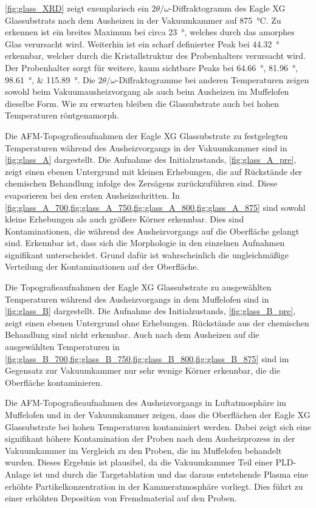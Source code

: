 \cref{fig:glass_XRD} zeigt exemplarisch ein $2\theta/\omega$-Diffraktogramm des Eagle XG Glassubstrats nach
dem Ausheizen in der Vakuumkammer auf \qty{875}{\degreeCelsius}.
Zu erkennen ist ein breites Maximum bei circa \qty{23}{\degree}, welches durch das amorphes Glas verursacht wird.
Weiterhin ist ein scharf definierter Peak bei \qty{44.32}{\degree} erkennbar, welcher durch die Kristallstruktur
des Probenhalters verursacht wird.
Der Probenhalter sorgt für weitere, kaum sichtbare Peaks bei \qtylist{64.66; 81.96; 98.61; 115.89}{\degree}.
Die $2\theta/\omega$-Diffraktogramme bei anderen Temperaturen zeigen sowohl beim Vakuumausheizvorgang als auch
beim Ausheizen im Muffelofen dieselbe Form.
Wie zu erwarten bleiben die Glassubstrate auch bei hohen Temperaturen röntgenamorph.

Die AFM-Topografieaufnahmen der Eagle XG Glassubstrate zu festgelegten Temperaturen während des Ausheizvorgangs
in der Vakuumkammer sind in \cref{fig:glass_A} dargestellt.
Die Aufnahme des Initialzustands, \cref{fig:glass_A_pre}, zeigt einen ebenen Untergrund mit kleinen Erhebungen,
die auf Rückstände der chemischen Behandlung infolge des Zersägens zurückzuführen sind.
Diese evaporieren bei den ersten Ausheizschritten.
In \cref{fig:glass_A_700,fig:glass_A_750,fig:glass_A_800,fig:glass_A_875} sind sowohl kleine Erhebungen als auch
größere Körner erkennbar.
Dies sind Kontaminationen, die während des Ausheizvorgangs auf die Oberfläche gelangt sind.
Erkennbar ist, dass sich die Morphologie in den einzelnen Aufnahmen signifikant unterscheidet.
Grund dafür ist wahrscheinlich die ungleichmäßige Verteilung der Kontaminationen auf der Oberfläche.

Die Topografieaufnahmen der Eagle XG Glassubstrate zu ausgewählten Temperaturen während des Ausheizvorgangs in
dem Muffelofen sind in \cref{fig:glass_B} dargestellt.
Die Aufnahme des Initialzustands, \cref{fig:glass_B_pre}, zeigt einen ebenen Untergrund ohne Erhebungen.
Rückstände aus der chemischen Behandlung sind nicht erkennbar.
Auch nach dem Ausheizen auf die ausgewählten Temperaturen in
\cref{fig:glass_B_700,fig:glass_B_750,fig:glass_B_800,fig:glass_B_875} sind im Gegensatz zur Vakuumkammer
nur sehr wenige Körner erkennbar, die die Oberfläche kontaminieren.

Die AFM-Topografieaufnahmen des Ausheizvorgangs in Luftatmosphäre im Muffelofen und in der Vakuumkammer zeigen,
dass die Oberflächen der Eagle XG Glassubstrate bei hohen Temperaturen kontaminiert werden.
Dabei zeigt sich eine signifikant höhere Kontamination der Proben nach dem Ausheizprozess in der Vakuumkammer
im Vergleich zu den Proben, die im Muffelofen behandelt wurden.
Dieses Ergebnis ist plausibel, da die Vakuumkammer Teil einer PLD-Anlage ist und durch die Targetablation und das
daraus entstehende Plasma eine erhöhte Partikelkonzentration in der Kammeratmosphäre vorliegt.
Dies führt zu einer erhöhten Deposition von Fremdmaterial auf den Proben.

